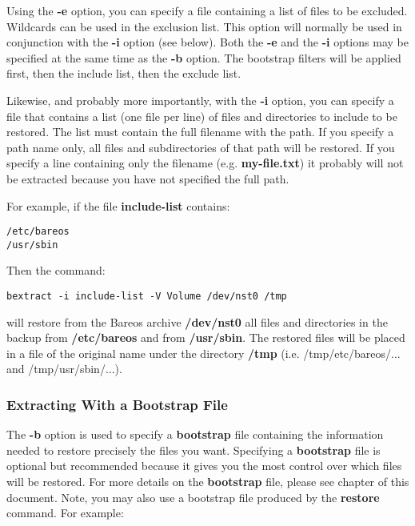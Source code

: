 Using the {\bf -e} option, you can specify a file containing a list of files
to be excluded. Wildcards can be used in the exclusion list. This option will
normally be used in conjunction with the {\bf -i} option (see below). Both the
{\bf -e} and the {\bf -i} options may be specified at the same time as the
{\bf -b} option. The bootstrap filters will be applied first, then the include
list, then the exclude list.

Likewise, and probably more importantly, with the {\bf -i} option, you can
specify a file that contains a list (one file per line) of files and
directories to include to be restored. The list must contain the full filename
with the path. If you specify a path name only, all files and subdirectories
of that path will be restored. If you specify a line containing only the
filename (e.g. {\bf my-file.txt}) it probably will not be extracted because
you have not specified the full path.

For example, if the file {\bf include-list} contains:

\footnotesize
\begin{verbatim}
/etc/bareos
/usr/sbin
\end{verbatim}
\normalsize

Then the command:

\footnotesize
\begin{verbatim}
bextract -i include-list -V Volume /dev/nst0 /tmp
\end{verbatim}
\normalsize

will restore from the Bareos archive {\bf /dev/nst0} all files and directories
in the backup from {\bf /etc/bareos} and from {\bf /usr/sbin}. The
restored files will be placed in a file of the original name under the
directory {\bf /tmp} (i.e. /tmp/etc/bareos/... and
/tmp/usr/sbin/...).

\subsubsection{Extracting With a Bootstrap File}

The {\bf -b} option is used to specify a {\bf bootstrap} file containing the
information needed to restore precisely the files you want. Specifying a {\bf
bootstrap} file is optional but recommended because it gives you the most
control over which files will be restored. For more details on the {\bf
bootstrap} file, please see
chapter of this document. Note, you may also use a bootstrap file produced by
the {\bf restore} command. For example:

